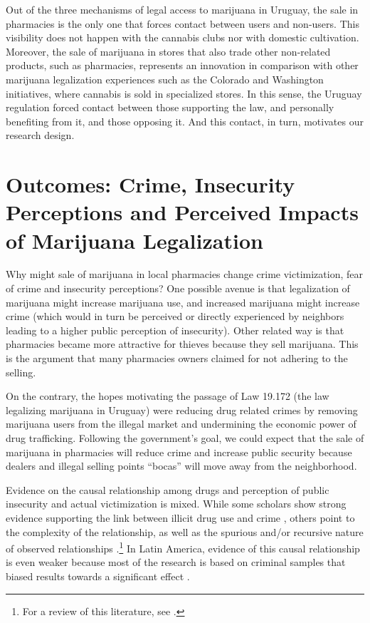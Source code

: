 \documentclass[11pt]{article}
\begin{document}
Out of the three mechanisms of legal access to marijuana in Uruguay, the sale in pharmacies is the only one that forces contact between users and non-users. This visibility does not happen with the cannabis clubs nor with domestic cultivation. Moreover, the sale of marijuana in stores that also trade other non-related products, such as pharmacies, represents an innovation in comparison with other marijuana legalization experiences such as the Colorado and Washington initiatives, where cannabis is sold in specialized stores. In this sense, the Uruguay regulation forced contact between those supporting the law, and personally benefiting from it, and those opposing it. And this contact, in turn, motivates our research design.

\section{Outcomes: Crime, Insecurity Perceptions and Perceived Impacts of Marijuana Legalization}

Why might sale of marijuana in local pharmacies change crime victimization, fear of crime and insecurity perceptions? One possible avenue is that legalization of marijuana might increase marijuana use, and increased marijuana might increase crime (which would in turn be perceived or directly experienced by neighbors leading to a higher public perception of insecurity). Other related way is that pharmacies became more attractive for thieves because they sell marijuana. This is the argument that many pharmacies owners claimed for not adhering to the selling.

On the contrary, the hopes motivating the passage of Law 19.172 (the law legalizing marijuana in Uruguay) were reducing drug related crimes by removing marijuana users from the illegal market and undermining the economic power of drug trafficking. Following the government's goal, we could expect that the sale of marijuana in pharmacies will reduce crime and increase public security because dealers and illegal selling points ``bocas'' will move away from the neighborhood.

Evidence on the causal relationship among drugs and perception of public insecurity and actual victimization is mixed. While some scholars show strong evidence supporting the link between illicit drug use and crime \citep{white2000dynamics}, others point to the complexity of the relationship, as well as the spurious and/or recursive nature of observed relationships \citep{gottfredson1990general, mcbride1993drugs}.\footnote{For a review of this literature, see \citet{brothers2003substance}.} In Latin America, evidence of this causal relationship is even weaker because most of the research is based on criminal samples that biased results towards a significant effect \citep{trajtenberg2018self}.
\end{document}
